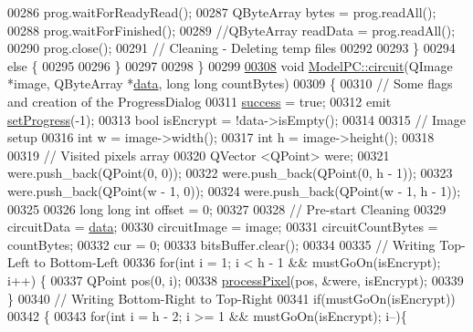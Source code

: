 \begin{DoxyCode}
00286         prog.waitForReadyRead();
00287         QByteArray bytes = prog.readAll();
00288         prog.waitForFinished();
00289         \textcolor{comment}{//QByteArray readData = prog.readAll();}
00290         prog.close();
00291         \textcolor{comment}{// Cleaning - Deleting temp files}
00292 
00293     \}
00294     \textcolor{keywordflow}{else} \{
00295 
00296     \}
00297 
00298 \}
00299 
\hypertarget{modelpc_8cpp_source_l00308}{}\hyperlink{class_model_p_c_a1d0091062a0c836b283ec2f67411623b}{00308} \textcolor{keywordtype}{void} \hyperlink{class_model_p_c_a1d0091062a0c836b283ec2f67411623b}{ModelPC::circuit}(QImage *image, QByteArray *\hyperlink{namespace_errors_dict_setup_adf4c30d205d29df7343e26f7c62b0685}{data}, \textcolor{keywordtype}{long} \textcolor{keywordtype}{long} countBytes)
00309 \{
00310     \textcolor{comment}{// Some flags and creation of the ProgressDialog}
00311     \hyperlink{class_model_p_c_a945ffbbc44a832b953c191debd448f4c}{success} = \textcolor{keyword}{true};
00312     emit \hyperlink{class_model_p_c_afdcd80f0ed5062e145a71f09b0897547}{setProgress}(-1);
00313     \textcolor{keywordtype}{bool} isEncrypt = !data->isEmpty();
00314 
00315     \textcolor{comment}{// Image setup}
00316     \textcolor{keywordtype}{int} w = image->width();
00317     \textcolor{keywordtype}{int} h = image->height();
00318 
00319     \textcolor{comment}{// Visited pixels array}
00320     QVector <QPoint> were;
00321     were.push\_back(QPoint(0, 0));
00322     were.push\_back(QPoint(0, h - 1));
00323     were.push\_back(QPoint(w - 1, 0));
00324     were.push\_back(QPoint(w - 1, h - 1));
00325 
00326     \textcolor{keywordtype}{long} \textcolor{keywordtype}{long} \textcolor{keywordtype}{int} offset = 0;
00327 
00328     \textcolor{comment}{// Pre-start Cleaning}
00329     circuitData = \hyperlink{namespace_errors_dict_setup_adf4c30d205d29df7343e26f7c62b0685}{data};
00330     circuitImage = image;
00331     circuitCountBytes = countBytes;
00332     cur = 0;
00333     bitsBuffer.clear();
00334 
00335     \textcolor{comment}{// Writing Top-Left to Bottom-Left}
00336     \textcolor{keywordflow}{for}(\textcolor{keywordtype}{int} i = 1; i < h - 1 && mustGoOn(isEncrypt); i++) \{
00337         QPoint pos(0, i);
00338         \hyperlink{class_model_p_c_a1171f9fe1550133dc9053a46b4e5bcfd}{processPixel}(pos, &were, isEncrypt);
00339     \}
00340     \textcolor{comment}{// Writing Bottom-Right to Top-Right}
00341     \textcolor{keywordflow}{if}(mustGoOn(isEncrypt))
00342     \{
00343         \textcolor{keywordflow}{for}(\textcolor{keywordtype}{int} i = h - 2; i >= 1 && mustGoOn(isEncrypt); i--)\{

\end{DoxyCode}
